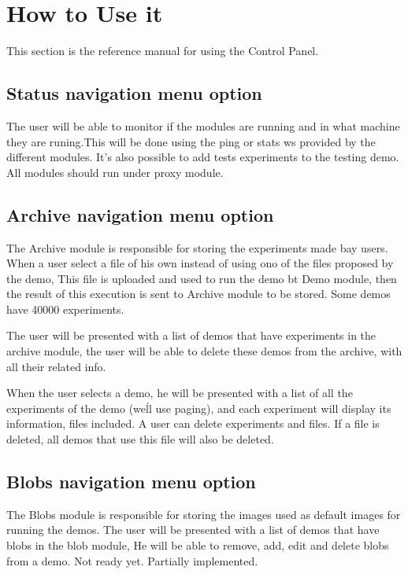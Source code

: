 \section{How to Use it}
This section is the reference manual for using the Control Panel.

\subsection{Status navigation menu option}
The user will be able to monitor if the modules are running and in what machine they are runing.This will be done using the ping or stats ws provided by the different modules.
It's also possible to add tests experiments to the testing demo.
All modules should run under proxy module.

\subsection{Archive navigation menu option}
The Archive module is responsible for storing the experiments made bay users. When a user select a file of his own instead of using ono of the files proposed by the demo, This file is uploaded and used to run the demo bt Demo module, then the result of this execution is sent to Archive module to be stored. Some demos have 40000 experiments.

The user will be presented with a list of demos that have experiments in the archive module, the user will be able to delete these demos from the archive, with all their related info.

When the user selects a demo, he will be presented with a list of all the experiments of the demo (we\'ll use paging), and each experiment will display its information, files included. A user can delete experiments and files. If a file is deleted, all demos that use this file will also be deleted.


\subsection{Blobs navigation menu option}
The Blobs module is responsible for storing the images used as default images for running the demos.
The user will be presented with a list of demos that have blobs in the blob module,
He will be able to remove, add, edit and delete blobs from a demo.
Not ready yet. Partially implemented.

